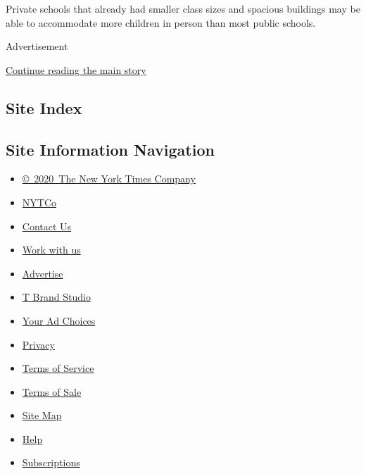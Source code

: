 Private schools that already had smaller class sizes and spacious
buildings may be able to accommodate more children in person than most
public schools.

Advertisement

\protect\hyperlink{after-bottom}{Continue reading the main story}

\hypertarget{site-index}{%
\subsection{Site Index}\label{site-index}}

\hypertarget{site-information-navigation}{%
\subsection{Site Information
Navigation}\label{site-information-navigation}}

\begin{itemize}
\tightlist
\item
  \href{https://help.nytimes.com/hc/en-us/articles/115014792127-Copyright-notice}{©~2020~The
  New York Times Company}
\end{itemize}

\begin{itemize}
\tightlist
\item
  \href{https://www.nytco.com/}{NYTCo}
\item
  \href{https://help.nytimes.com/hc/en-us/articles/115015385887-Contact-Us}{Contact
  Us}
\item
  \href{https://www.nytco.com/careers/}{Work with us}
\item
  \href{https://nytmediakit.com/}{Advertise}
\item
  \href{http://www.tbrandstudio.com/}{T Brand Studio}
\item
  \href{https://www.nytimes.com/privacy/cookie-policy\#how-do-i-manage-trackers}{Your
  Ad Choices}
\item
  \href{https://www.nytimes.com/privacy}{Privacy}
\item
  \href{https://help.nytimes.com/hc/en-us/articles/115014893428-Terms-of-service}{Terms
  of Service}
\item
  \href{https://help.nytimes.com/hc/en-us/articles/115014893968-Terms-of-sale}{Terms
  of Sale}
\item
  \href{https://spiderbites.nytimes.com}{Site Map}
\item
  \href{https://help.nytimes.com/hc/en-us}{Help}
\item
  \href{https://www.nytimes.com/subscription?campaignId=37WXW}{Subscriptions}
\end{itemize}
